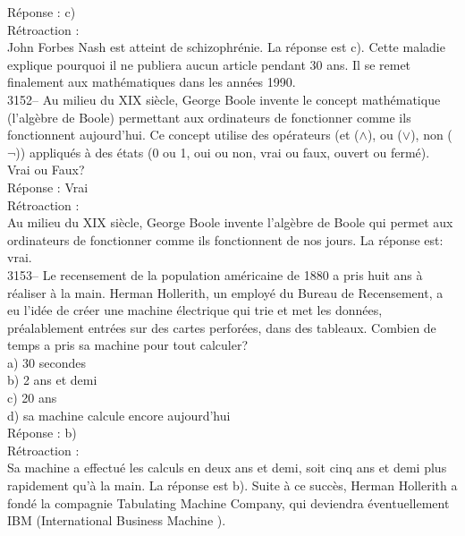 \documentclass[letterpaper, 12pt]{article}
\begin{document}
R\'eponse : c)\\

R\'etroaction :\\
John Forbes Nash est atteint de schizophr\'enie. La r\'eponse est c). Cette maladie explique pourquoi il ne publiera aucun article pendant 30 ans. Il se remet finalement aux math\'ematiques dans les ann\'ees 1990.\\



3152-- Au milieu du {\scriptsize XIX\ieme{}} si\`ecle, George Boole invente le concept math\'ematique (l'alg\`ebre de Boole) permettant aux ordinateurs de fonctionner comme ils fonctionnent aujourd'hui. Ce concept utilise des op\'erateurs (et ($\wedge$), ou ($\vee$), non ($\neg$)) appliqu\'es \`a des \'etats (0 ou 1, oui ou non, vrai ou faux, ouvert ou ferm\'e).\\
Vrai ou Faux?\\

R\'eponse : Vrai\\

R\'etroaction :\\
Au milieu du {\scriptsize XIX\ieme{}} si\`ecle, George Boole invente l'alg\`ebre de Boole qui permet aux ordinateurs de fonctionner comme ils fonctionnent de nos jours. La r\'eponse est: vrai.\\



3153-- Le recensement de la population am\'ericaine de 1880 a pris huit ans \`a r\'ealiser \`a la main. Herman Hollerith, un employ\'e du Bureau de Recensement, a eu l'id\'ee de cr\'eer une machine \'electrique qui trie et met les donn\'ees, pr\'ealablement entr\'ees sur des cartes perfor\'ees, dans des tableaux. Combien de temps a pris sa machine pour tout calculer?\\

a) 30 secondes\\
b) 2 ans et demi\\
c) 20 ans\\
d) sa machine calcule encore aujourd'hui\\

R\'eponse : b)\\

R\'etroaction :\\
Sa machine a effectu\'e les calculs en deux ans et demi, soit cinq ans et demi plus rapidement qu'\`a la main. La r\'eponse est b). Suite \`a ce succ\`es, Herman Hollerith a fond\'e la compagnie \og Tabulating Machine Company\fg, qui deviendra \'eventuellement IBM (\og International Business Machine \fg).\\
\end{document}
